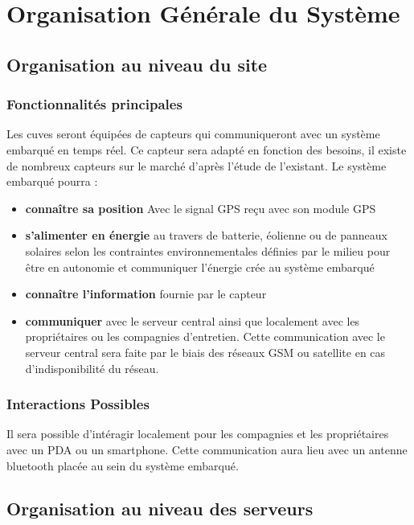 \section{Organisation Générale du Système}

\subsection{Organisation au niveau du site}

\subsubsection{Fonctionnalités principales}
Les cuves seront équipées de capteurs qui communiqueront avec un système embarqué en temps réel. Ce capteur sera adapté en fonction des besoins, il existe de nombreux capteurs sur le marché d'après l'étude de l'existant. Le système embarqué pourra : 
\begin{itemize}
\item \textbf{connaître sa position} Avec le signal GPS reçu avec son module GPS
\item \textbf{s'alimenter en énergie} au travers de batterie, éolienne ou de panneaux solaires selon les contraintes environnementales définies par le milieu pour être en autonomie et communiquer l'énergie crée au système embarqué
\item \textbf{connaître l'information} fournie par le capteur
\item \textbf{communiquer} avec le serveur central ainsi que localement avec les propriétaires ou les compagnies d'entretien. Cette communication avec le serveur central sera faite par le biais des réseaux GSM ou satellite en cas d'indisponibilité du réseau. 
\end{itemize}

\subsubsection{Interactions Possibles}

Il sera possible d'intéragir localement pour les compagnies et les propriétaires avec un PDA ou un smartphone. Cette communication aura lieu avec un antenne bluetooth placée au sein du système embarqué.


\subsection{Organisation au niveau des serveurs}

